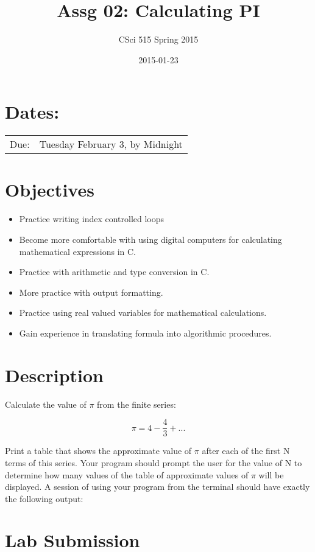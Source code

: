 \documentclass[11pt]{article}
\title{Assg 02: Calculating PI}
\author{CSci 515 Spring 2015}
\date{2015-01-23}
\begin{document}
\maketitle


\section*{Dates:}
\label{sec-1}


\begin{center}
\begin{tabular}{ll}
 Due:  &  Tuesday February 3, by Midnight  \\
\end{tabular}
\end{center}
\section*{Objectives}
\label{sec-2}

\begin{itemize}
\item Practice writing index controlled loops
\item Become more comfortable with using digital computers for calculating mathematical expressions in C.
\item Practice with arithmetic and type conversion in C.
\item More practice with output formatting.
\item Practice using real valued variables for mathematical calculations.
\item Gain experience in translating formula into algorithmic procedures.
\end{itemize}
\section*{Description}
\label{sec-3}

Calculate the value of $\pi$ from the finite series:

$$ \pi = 4 - \frac{4}{3} + ... $$

Print a table that shows the approximate value of $\pi$ after each of
the first N terms of this series.  Your program should prompt the user
for the value of N to determine how many values of the table of
approximate values of $\pi$ will be displayed.  A session of using
your program from the terminal should have exactly the following
output:
\section*{Lab Submission}
\label{sec-4}
\end{document}
